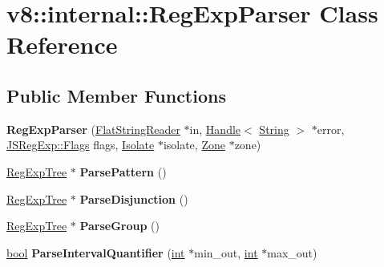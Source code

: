 \hypertarget{classv8_1_1internal_1_1RegExpParser}{}\section{v8\+:\+:internal\+:\+:Reg\+Exp\+Parser Class Reference}
\label{classv8_1_1internal_1_1RegExpParser}
\subsection*{Public Member Functions}
\begin{DoxyCompactItemize}
\item 
\mbox{\label{classv8_1_1internal_1_1RegExpParser_a3baf2110ea86744b051e8c1bf7e1f377}} 
{\bfseries Reg\+Exp\+Parser} (\mbox{\hyperlink{classv8_1_1internal_1_1FlatStringReader}{Flat\+String\+Reader}} $\ast$in, \mbox{\hyperlink{classv8_1_1internal_1_1Handle}{Handle}}$<$ \mbox{\hyperlink{classv8_1_1internal_1_1String}{String}} $>$ $\ast$error, \mbox{\hyperlink{classv8_1_1base_1_1Flags}{J\+S\+Reg\+Exp\+::\+Flags}} flags, \mbox{\hyperlink{classv8_1_1internal_1_1Isolate}{Isolate}} $\ast$isolate, \mbox{\hyperlink{classv8_1_1internal_1_1Zone}{Zone}} $\ast$zone)
\item 
\mbox{\label{classv8_1_1internal_1_1RegExpParser_a9ea41c03d616e08f4ae58bc7b90c7a85}} 
\mbox{\hyperlink{classv8_1_1internal_1_1RegExpTree}{Reg\+Exp\+Tree}} $\ast$ {\bfseries Parse\+Pattern} ()
\item 
\mbox{\label{classv8_1_1internal_1_1RegExpParser_afcbf82d3e4312f5ee43810917474971c}} 
\mbox{\hyperlink{classv8_1_1internal_1_1RegExpTree}{Reg\+Exp\+Tree}} $\ast$ {\bfseries Parse\+Disjunction} ()
\item 
\mbox{\label{classv8_1_1internal_1_1RegExpParser_ac3a414944b23eb64fab9c8c6443f99fe}} 
\mbox{\hyperlink{classv8_1_1internal_1_1RegExpTree}{Reg\+Exp\+Tree}} $\ast$ {\bfseries Parse\+Group} ()
\item 
\mbox{\label{classv8_1_1internal_1_1RegExpParser_aa11f1c6809336353f4c83827c9d13bb6}} 
\mbox{\hyperlink{classbool}{bool}} {\bfseries Parse\+Interval\+Quantifier} (\mbox{\hyperlink{classint}{int}} $\ast$min\+\_\+out, \mbox{\hyperlink{classint}{int}} $\ast$max\+\_\+out)

\end{DoxyCompactItemize}
